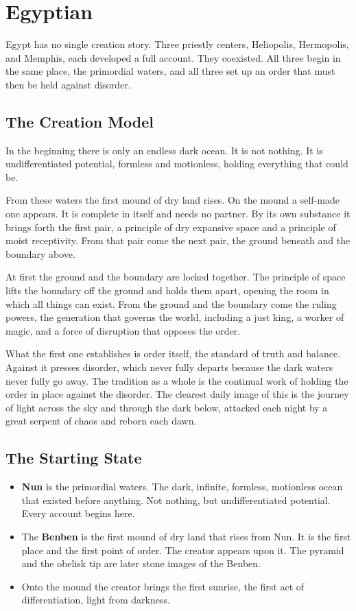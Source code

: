 \section{Egyptian}

Egypt has no single creation story. Three priestly centers, Heliopolis, Hermopolis, and Memphis, each developed a full account. They coexisted. All three begin in the same place, the primordial waters, and all three set up an order that must then be held against disorder.

\subsection{The Creation Model}

In the beginning there is only an endless dark ocean. It is not nothing. It is undifferentiated potential, formless and motionless, holding everything that could be.

From these waters the first mound of dry land rises. On the mound a self-made one appears. It is complete in itself and needs no partner. By its own substance it brings forth the first pair, a principle of dry expansive space and a principle of moist receptivity. From that pair come the next pair, the ground beneath and the boundary above.

At first the ground and the boundary are locked together. The principle of space lifts the boundary off the ground and holds them apart, opening the room in which all things can exist. From the ground and the boundary come the ruling powers, the generation that governs the world, including a just king, a worker of magic, and a force of disruption that opposes the order.

What the first one establishes is order itself, the standard of truth and balance. Against it presses disorder, which never fully departs because the dark waters never fully go away. The tradition as a whole is the continual work of holding the order in place against the disorder. The clearest daily image of this is the journey of light across the sky and through the dark below, attacked each night by a great serpent of chaos and reborn each dawn.

\subsection{The Starting State}

\begin{itemize}
 \item \textbf{Nun} is the primordial waters. The dark, infinite, formless, motionless ocean that existed before anything. Not nothing, but undifferentiated potential. Every account begins here.
 \item The \textbf{Benben} is the first mound of dry land that rises from Nun. It is the first place and the first point of order. The creator appears upon it. The pyramid and the obelisk tip are later stone images of the Benben.
 \item Onto the mound the creator brings the first sunrise, the first act of differentiation, light from darkness.
\end{itemize}

